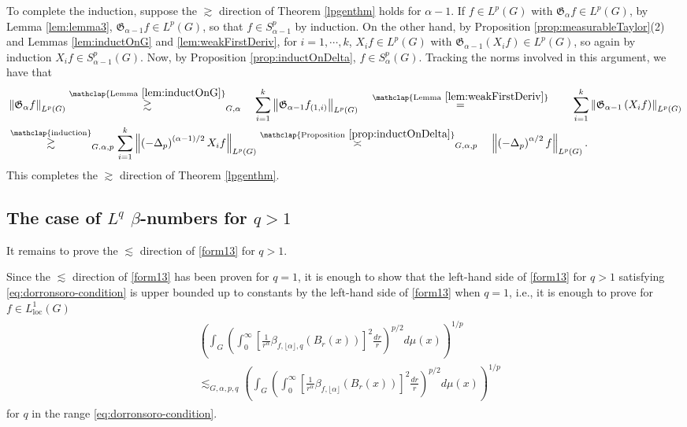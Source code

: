 \documentclass[11pt,reqno]{amsart}
\newcommand{\1}{\mathbf 1}
\begin{document}
To complete the induction, suppose the $\gtrsim$ direction of Theorem \ref{lpgenthm} holds for $\alpha-1$. If $f\in L^p\left(G\right)$ with $\mathfrak{G}_\alpha f\in L^p\left(G\right)$, by Lemma \ref{lem:lemma3}, $\mathfrak{G}_{\alpha-1}f\in L^p\left(G\right)$, so that $f\in S^p_{\alpha-1}$ by induction. On the other hand, by Proposition \ref{prop:measurableTaylor}(2) and Lemmas \ref{lem:inductOnG} and \ref{lem:weakFirstDeriv}, for $i=1,\cdots,k$, $X_if\in L^p\left(G\right)$ with $\mathfrak{G}_{\alpha-1}\left(X_if\right)\in L^p\left(G\right)$, so again by induction $X_if\in S^p_{\alpha-1}\left(G\right)$. Now, by Proposition \ref{prop:inductOnDelta}, $f\in S^p_\alpha\left(G\right)$. Tracking the norms involved in this argument, we have that
\begin{align*}
&\left\|\mathfrak{G}_\alpha f\right\|_{L^p\left(G\right)}\stackrel{\mathclap{\mathrm{Lemma~}\ref{lem:inductOnG}}}{\gtrsim}_{G,\alpha}\quad\sum_{i=1}^k \left\|\mathfrak{G}_{\alpha-1}f_{\left(1,i\right)}\right\|_{L^p\left(G\right)}\quad\stackrel{\mathclap{\mathrm{Lemma~}\ref{lem:weakFirstDeriv}}}{=}\qquad\sum_{i=1}^k \left\|\mathfrak{G}_{\alpha-1}\left(X_if\right)\right\|_{L^p\left(G\right)}\\
&\stackrel{\mathclap{\mathrm{induction}}}{\gtrsim}_{G.\alpha,p}\sum_{i=1}^k \left\|\left(-\Delta_p\right)^{\left(\alpha-1\right)/2}X_if\right\|_{L^p\left(G\right)}\stackrel{\mathclap{\mathrm{Proposition~}\ref{prop:inductOnDelta}}}{\asymp}_{G,\alpha,p} \quad\left\|\left(-\Delta_p\right)^{\alpha/2}f\right\|_{L^p\left(G\right)}.
\end{align*}
This completes the $\gtrsim$ direction of Theorem \ref{lpgenthm}.






\subsection{The case of $L^q$ $\beta$-numbers for $q>1$}\label{subsec:q>1}
It remains to prove the $\lesssim$ direction of \eqref{form13} for $q>1$.

Since the $\lesssim$ direction of \eqref{form13} has been proven for $q=1$, it is enough to show that the left-hand side of \eqref{form13} for $q>1$ satisfying \eqref{eq:dorronsoro-condition} is upper bounded up to constants by the left-hand side of \eqref{form13} when $q=1$, i.e., it is enough to prove for $f\in L^1_{\mathrm{loc}}\left(G\right)$
\begin{align}\label{eq:lq-l1}
\begin{aligned}
    &\left(\int_G \left(\int_0^\infty \left[\frac 1{r^\alpha} \beta_{f,\lfloor \alpha \rfloor,q}\left(B_r\left(x\right)\right) \right]^2 \frac{dr}{r} \right)^{p/2} d\mu\left(x\right) \right)^{1/p} \\
    &\lesssim_{G,\alpha,p,q}\left(\int_G \left(\int_0^\infty \left[\frac 1{r^\alpha} \beta_{f,\lfloor \alpha \rfloor}\left(B_r\left(x\right)\right) \right]^2 \frac{dr}{r} \right)^{p/2} d\mu\left(x\right) \right)^{1/p}
\end{aligned}
\end{align}
for $q$ in the range \eqref{eq:dorronsoro-condition}.
\end{document}
